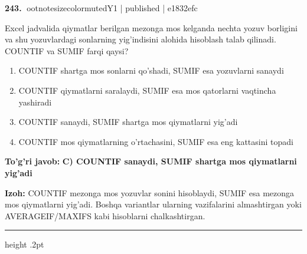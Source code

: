 \documentclass[10pt,a4paper]{article}
\begin{document}
\textbf{\color{ink}243.} {ootnotesizecolor{muted}Y1 | published | e1832efc}
\par
Excel jadvalida qiymatlar berilgan mezonga mos kelganda nechta yozuv borligini va shu yozuvlardagi sonlarning yig'indisini alohida hisoblash talab qilinadi. COUNTIF va SUMIF farqi qaysi?
\begin{enumerate}[label=\Alph*),leftmargin=9mm]
\item COUNTIF shartga mos sonlarni qo'shadi, SUMIF esa yozuvlarni sanaydi
\item COUNTIF qiymatlarni saralaydi, SUMIF esa mos qatorlarni vaqtincha yashiradi
\item COUNTIF sanaydi, SUMIF shartga mos qiymatlarni yig'adi
\item COUNTIF mos qiymatlarning o'rtachasini, SUMIF esa eng kattasini topadi
\end{enumerate}
\begin{tcolorbox}[enhanced,breakable,colback=teal!4,colframe=teal!55!black,boxrule=0.45pt,arc=1.2mm,left=2.8mm,right=2.8mm,top=2mm,bottom=2mm]
\textbf{\color{teal}To'g'ri javob:} \textbf{C) COUNTIF sanaydi, SUMIF shartga mos qiymatlarni yig'adi}
\par\smallskip
\textbf{Izoh:} COUNTIF mezonga mos yozuvlar sonini hisoblaydi, SUMIF esa mezonga mos qiymatlarni yig'adi. Boshqa variantlar ularning vazifalarini almashtirgan yoki AVERAGEIF/MAXIFS kabi hisoblarni chalkashtirgan.
\end{tcolorbox}
\vspace{2mm}\hrule height .2pt\vspace{2mm}
\end{document}
